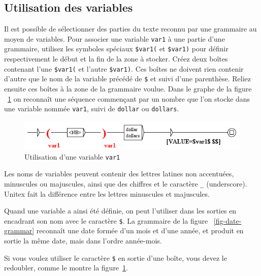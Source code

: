 
\subsection{Utilisation des variables}
\label{section-using-variables}
\index{\verb+$+}

Il est possible de sélectionner des parties du texte reconnu par une grammaire au moyen
de variables. Pour associer une variable \verb+var1+ à une partie d’une grammaire, utilisez
les symboles spéciaux \verb+$var1(+ et \verb+$var1)+ pour définir respectivement le début et
la fin de la zone à stocker. Créez deux boîtes contenant l’une \verb+$var1(+ et l’autre
\verb+$var1)+. Ces boîtes ne doivent rien contenir d’autre que le nom de la variable précédé de
 \verb+$+ et suivi d’une parenthèse. Reliez ensuite ces boîtes à la zone de la grammaire voulue.
 Dans le graphe de la figure ~\ref{fig-using-variable} on reconnaît une séquence commençant par
 un nombre que l’on stocke dans une variable nommée \verb+var1+, suivi de \verb+dollar+ ou
 \verb+dollars+.

\bigskip
\begin{figure}[h]
\begin{center}
\includegraphics[width=13.5cm]{resources/img/fig5-16.png}
\caption{Utilisation d’une variable
\texttt{var1}\label{fig-using-variable}}
\end{center}
\end{figure}

\noindent Les noms de variables peuvent contenir des lettres latines non accentuées, minuscules
ou majuscules, ainsi que des chiffres et le caractère \verb+_+ (underscore).
\index{\verb+_+} Unitex fait la différence entre les lettres minuscules
et majuscules.

\bigskip
\noindent Quand une variable a ainsi été définie, on peut l’utiliser dans les sorties en encadrant
son nom avec le caractère \verb+$+.\index{\verb+$+} La grammaire de la figure
~\ref{fig-date-grammar} reconnaît une date formée d’un mois et d’une année,
 et produit en sortie la même date, mais dans l’ordre année-mois.

\noindent Si vous voulez utiliser le caractère \verb+$+ en sortie d'une boîte, vous devez le
redoubler, comme le montre la figure~\ref{fig-using-variable}.

